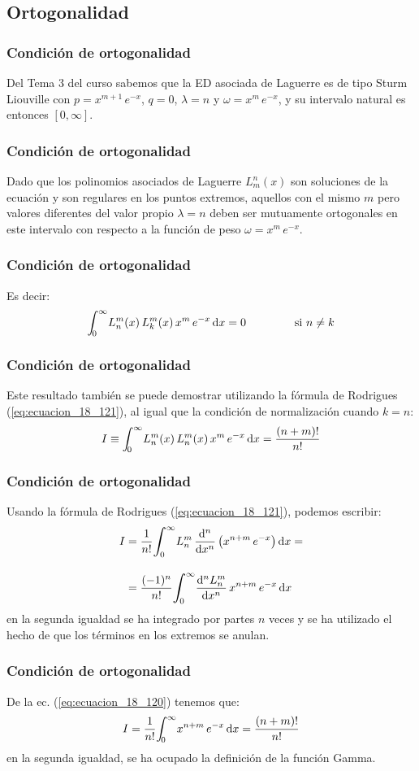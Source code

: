 \documentclass[12pt]{beamer}
\begin{document}
\subsection{Ortogonalidad}

\begin{frame}
\frametitle{Condición de ortogonalidad}
Del Tema 3 del curso sabemos que la ED asociada de Laguerre es de tipo Sturm Liouville con $p = x^{m+1} \, e^{-x}$, $q = 0$, $\lambda = n$ y $\omega = x^{m} \, e^{-x}$, y su intervalo natural es entonces $[0, \infty]$.
\end{frame}
\begin{frame}
\frametitle{Condición de ortogonalidad}
Dado que los polinomios asociados de Laguerre $L_{m}^{n} (x)$ son soluciones de la ecuación y son regulares en los puntos extremos, aquellos con el mismo $m$ pero valores diferentes del valor propio $\lambda = n$ deben ser mutuamente ortogonales en este intervalo con respecto a la función de peso $\omega = x^{m} \, e^{-x}$.
\end{frame}
\begin{frame}
\frametitle{Condición de ortogonalidad}
Es decir:
\pause
\begin{align*}
\scaleint{5ex}_{\bs 0}^{\infty} L_{n}^{m} (x) \, L_{k}^{m} (x) \, x^{m} \, e^{-x} \dd{x} = 0 \hspace{1.5cm} \mbox{si } n \neq k
\end{align*}
\end{frame}
\begin{frame}
\frametitle{Condición de ortogonalidad}
Este resultado también se puede demostrar utilizando la fórmula de Rodrigues (\ref{eq:ecuacion_18_121}), al igual que la condición de normalización cuando $k = n$:
\pause
\begin{align}
I \equiv \scaleint{5ex}_{\bs 0}^{\infty} L_{n}^{m} (x) \, L_{n}^{m} (x) \, x^{m} \, e^{-x} \dd{x} =\dfrac{(n + m)!}{n!}
\label{eq:ecuacion_18_122}
\end{align}
\end{frame}
\begin{frame}
\frametitle{Condición de ortogonalidad}
Usando la fórmula de Rodrigues (\ref{eq:ecuacion_18_121}), podemos escribir:
\pause
\begin{align*}
I &= \dfrac{1}{n!} \scaleint{6ex}_{\bs 0}^{\infty} L_{n}^{m} \, \dv[n]{x} \left( x^{n+m} \, e^{-x} \right) \dd{x} = \\[1em]
&= \dfrac{(-1)^{n}}{n!} \scaleint{6ex}_{\bs 0}^{\infty} \dv[n]{L_{n}^{m}}{x} \, x^{n+m} \, e^{-x} \dd{x}
\end{align*}
en la segunda igualdad se ha integrado por partes $n$ veces y se ha utilizado el hecho de que los términos en los extremos se anulan.
\end{frame}
\begin{frame}
\frametitle{Condición de ortogonalidad}
De la ec. (\ref{eq:ecuacion_18_120}) tenemos que:
\pause
\begin{align*}
I = \dfrac{1}{n!} \scaleint{5ex}_{\bs 0}^{\infty} x^{n+m} \, e^{-x} \dd{x} = \dfrac{(n + m)!}{n!}
\end{align*}
en la segunda igualdad, se ha ocupado la definición de la función Gamma.
\end{frame}
\end{document}
